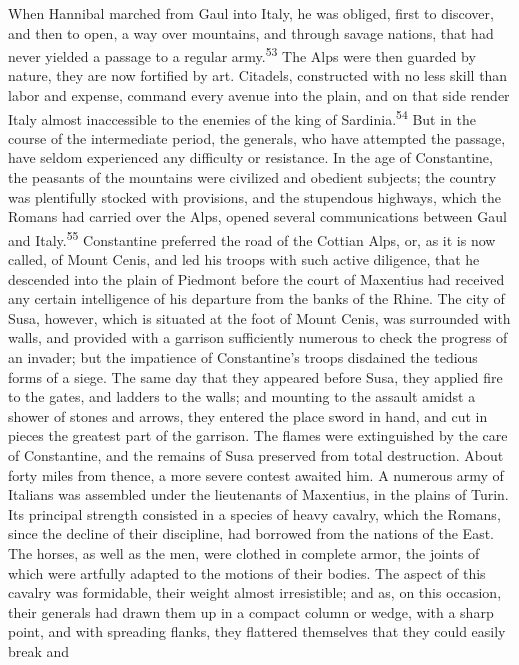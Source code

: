 When Hannibal marched from Gaul into Italy, he was obliged, first
to discover, and then to open, a way over mountains, and through
savage nations, that had never yielded a passage to a regular
army.\textsuperscript{53} The Alps were then guarded by nature, they are now
fortified by art. Citadels, constructed with no less skill than
labor and expense, command every avenue into the plain, and on
that side render Italy almost inaccessible to the enemies of the
king of Sardinia.\textsuperscript{54} But in the course of the intermediate
period, the generals, who have attempted the passage, have seldom
experienced any difficulty or resistance. In the age of
Constantine, the peasants of the mountains were civilized and
obedient subjects; the country was plentifully stocked with
provisions, and the stupendous highways, which the Romans had
carried over the Alps, opened several communications between Gaul
and Italy.\textsuperscript{55} Constantine preferred the road of the Cottian Alps,
or, as it is now called, of Mount Cenis, and led his troops with
such active diligence, that he descended into the plain of
Piedmont before the court of Maxentius had received any certain
intelligence of his departure from the banks of the Rhine. The
city of Susa, however, which is situated at the foot of Mount
Cenis, was surrounded with walls, and provided with a garrison
sufficiently numerous to check the progress of an invader; but
the impatience of Constantine’s troops disdained the tedious
forms of a siege. The same day that they appeared before Susa,
they applied fire to the gates, and ladders to the walls; and
mounting to the assault amidst a shower of stones and arrows,
they entered the place sword in hand, and cut in pieces the
greatest part of the garrison. The flames were extinguished by
the care of Constantine, and the remains of Susa preserved from
total destruction. About forty miles from thence, a more severe
contest awaited him. A numerous army of Italians was assembled
under the lieutenants of Maxentius, in the plains of Turin. Its
principal strength consisted in a species of heavy cavalry, which
the Romans, since the decline of their discipline, had borrowed
from the nations of the East. The horses, as well as the men,
were clothed in complete armor, the joints of which were artfully
adapted to the motions of their bodies. The aspect of this
cavalry was formidable, their weight almost irresistible; and as,
on this occasion, their generals had drawn them up in a compact
column or wedge, with a sharp point, and with spreading flanks,
they flattered themselves that they could easily break and
